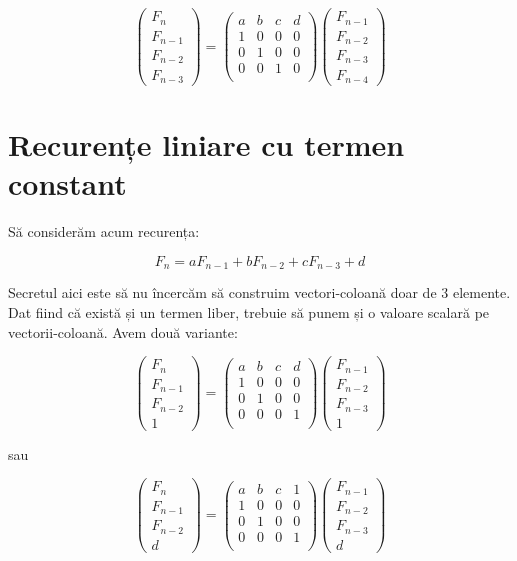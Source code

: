 \documentclass[../main.tex]{subfiles}
\begin{document}
$$
\begin{pmatrix} F_{n} \\ F_{n-1} \\ F_{n-2} \\ F_{n-3} \end{pmatrix}
=
\begin{pmatrix}
  a & b & c & d \\
  1 & 0 & 0 & 0 \\
  0 & 1 & 0 & 0 \\
  0 & 0 & 1 & 0 \\
\end{pmatrix}
\begin{pmatrix} F_{n-1} \\ F_{n-2} \\ F_{n-3} \\ F_{n-4} \end{pmatrix}
$$

\section{Recurențe liniare cu termen constant}

Să considerăm acum recurența:

$$F_{n} = a F_{n - 1} + b F_{n - 2} + c F_{n-3} + d$$

Secretul aici este să nu încercăm să construim vectori-coloană doar de 3 elemente. Dat fiind că există și un termen liber, trebuie să punem și o valoare scalară pe vectorii-coloană. Avem două variante:

$$
\begin{pmatrix} F_{n} \\ F_{n-1} \\ F_{n-2} \\ 1 \end{pmatrix}
=
\begin{pmatrix}
  a & b & c & d \\
  1 & 0 & 0 & 0 \\
  0 & 1 & 0 & 0 \\
  0 & 0 & 0 & 1 \\
\end{pmatrix}
\begin{pmatrix} F_{n-1} \\ F_{n-2} \\ F_{n-3} \\ 1 \end{pmatrix}
$$

sau

$$
\begin{pmatrix} F_{n} \\ F_{n-1} \\ F_{n-2} \\ d \end{pmatrix}
=
\begin{pmatrix}
  a & b & c & 1 \\
  1 & 0 & 0 & 0 \\
  0 & 1 & 0 & 0 \\
  0 & 0 & 0 & 1 \\
\end{pmatrix}
\begin{pmatrix} F_{n-1} \\ F_{n-2} \\ F_{n-3} \\ d \end{pmatrix}
$$
\end{document}
